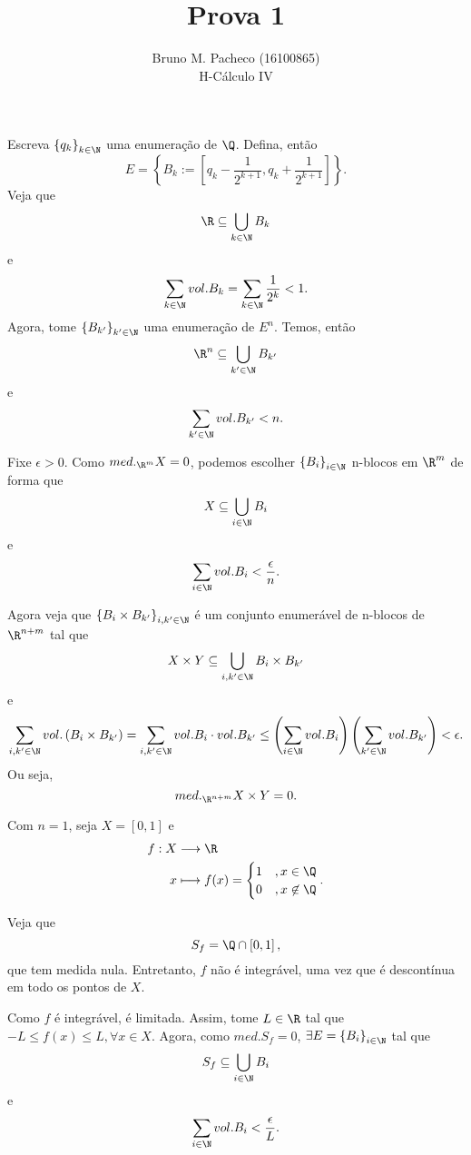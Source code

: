 \documentclass[a4paper]{report}
\begin{document}
 
\title{Prova 1}
\author{Bruno M. Pacheco (16100865)\\
H-Cálculo IV}
 
\maketitle
 

Escreva $\left\{ q_k \right\} _{k\in \N}$ uma enumeração de $\Q$. Defina, então \[
E = \left\{ B_k:= \left[ q_k -\frac{1}{2^{k+1}}, q_k+\frac{1}{2^{k+1}}\right]  \right\} 
.\] Veja que \[
\R\subseteq \bigcup_{k\in \N} B_k
\] e \[
\sum_{k\in \N} vol. B_k = \sum_{k\in \N} \frac{1}{2^{k}} < 1
.\] Agora, tome $\left\{ B_{k'} \right\} _{k'\in \N}$ uma enumeração de $E^{n}$. Temos, então \[
\R^{n} \subseteq \bigcup_{k'\in \N} B_{k'}
\] e \[
\sum_{k'\in \N} vol. B_{k'} < n
.\]

Fixe $\epsilon  > 0$. Como $med._{\R^{m}} X = 0$, podemos escolher $\left\{ B_i \right\} _{i\in \N}$ n-blocos em $\R^{m}$ de forma que \[
X \subseteq \bigcup_{i\in \N} B_i
\] e \[
\sum_{i\in \N} vol. B_i < \frac{\epsilon}{n}
.\]

Agora veja que $\left\{ B_i\times B_{k'} \right\} _{i, k'\in \N}$ é um conjunto enumerável de n-blocos de $\R^{n+m}$ tal que \[
X\times Y \subseteq \bigcup_{i, k'\in \N} B_i\times B_{k'}
\] e \[
\sum_{i, k'\in \N} vol. \left( B_i\times B_{k'} \right) = \sum_{i,k'\in \N} vol. B_i \cdot vol. B_{k'} \le \left(  \sum_{i\in \N} vol. B_i \right)  \left(  \sum_{k'\in \N} vol. B_{k'}\right) < \epsilon
.\] Ou seja, \[
med._{\R^{n+m}} X\times Y = 0
.\] 



Com $n=1$, seja $X=\left[ 0,1 \right] $ e 
\begin{align*}
    f: X &\longrightarrow \R \\
    x &\longmapsto f(x) = \begin{cases}
	1 &, x\in \Q \\
	0 &, x\not\in \Q
    \end{cases}
.\end{align*}

Veja que \[
S_f = \Q\cap \left[ 0,1 \right] 
,\] que tem medida nula. Entretanto, $f$ não é integrável, uma vez que é descontínua em todo os pontos de $X$.


Como $f$ é integrável, é limitada. Assim, tome $L\in \R$ tal que $-L\le f\left( x \right) \le L, \forall x\in X$. Agora, como $med.S_f = 0$, $\exists E=\left\{ B_i \right\} _{i\in \N}$ tal que \[
S_f \subseteq\bigcup_{i\in \N} B_i
\] e \[
\sum_{i\in \N} vol. B_i < \frac{\epsilon}{L}
.\] 
\end{document}
